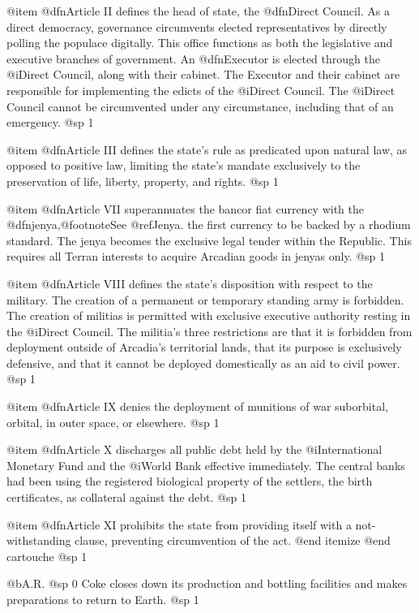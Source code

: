 @item
@dfn{Article II} defines the head of state, the @dfn{Direct Council}. As a direct democracy, governance circumvents elected representatives by directly polling the populace digitally. This office functions as both the legislative and executive branches of government. An @dfn{Executor} is elected through the @i{Direct Council}, along with their cabinet. The Executor and their cabinet are responsible for implementing the edicts of the @i{Direct Council}. The @i{Direct Council} cannot be circumvented under any circumstance, including that of an emergency.
@sp 1

@item
@dfn{Article III} defines the state's rule as predicated upon natural law, as opposed to positive law, limiting the state's mandate exclusively to the preservation of life, liberty, property, and rights.
@sp 1

@item
@dfn{Article VII} superannuates the bancor fiat currency with the @dfn{jenya},@footnote{See @ref{Jenya}.} the first currency to be backed by a rhodium standard. The jenya becomes the exclusive legal tender within the Republic. This requires all Terran interests to acquire Arcadian goods in jenyas only.
@sp 1

@item
@dfn{Article VIII} defines the state's disposition with respect to the military. The creation of a permanent or temporary standing army is forbidden. The creation of militias is permitted with exclusive executive authority resting in the @i{Direct Council}. The militia's three restrictions are that it is forbidden from deployment outside of Arcadia's territorial lands, that its purpose is exclusively defensive, and that it cannot be deployed domestically as an aid to civil power.
@sp 1

@item
@dfn{Article IX} denies the deployment of munitions of war suborbital, orbital, in outer space, or elsewhere.
@sp 1

@item
@dfn{Article X} discharges all public debt held by the @i{International Monetary Fund} and the @i{World Bank} effective immediately. The central banks had been using the registered biological property of the settlers, the birth certificates, as collateral against the debt.
@sp 1

@item
@dfn{Article XI} prohibits the state from providing itself with a not-withstanding clause, preventing circumvention of the act.
@end itemize
@end cartouche
@sp 1

@b{A.R.}
@sp 0
Coke closes down its production and bottling facilities and makes preparations to return to Earth.
@sp 1

